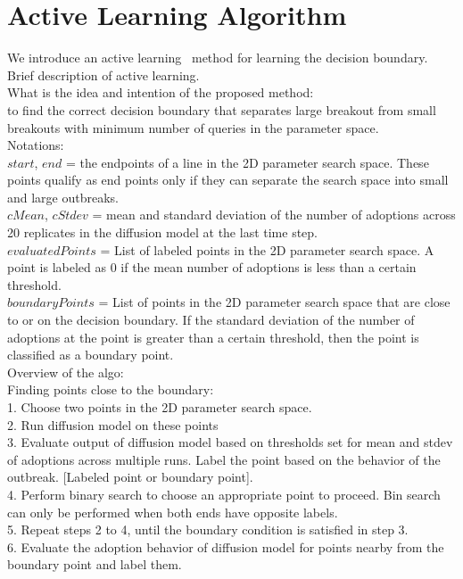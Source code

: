 \section{Active Learning Algorithm}
We introduce an active learning~\cite{sung95active} method for learning the decision boundary.
Brief description of active learning.\\
What is the idea and intention of the proposed method: \\
to find the correct decision boundary that separates large breakout from small breakouts with minimum number of queries in the parameter space.\\
\noindent
Notations:\\
$start$, $end$ = the endpoints of a line in the 2D parameter search space. These points qualify as end points only if they can separate the search space into small and large outbreaks. \\
\noindent
$cMean$, $cStdev$ = mean and standard deviation of the number of adoptions across 20 replicates in the diffusion model at the last time step.\\
\noindent
$evaluatedPoints$ = List of labeled points in the 2D parameter search space. A point is labeled as 0 if the mean number of adoptions is less than a certain threshold.\\
\noindent
$boundaryPoints$ = List of points in the 2D parameter search space that are close to or on the decision boundary. If the standard deviation of the number of adoptions at the point is greater than a certain threshold, then the point is classified as a boundary point.\\
Overview of the algo:\\
Finding points close to the boundary:\\
1. Choose two points in the 2D parameter search space.\\
2. Run diffusion model on these points\\
3. Evaluate output of diffusion model based on thresholds set for mean and stdev of adoptions across multiple runs. Label the point based on the behavior of the outbreak. [Labeled point or boundary point].\\
4. Perform binary search to choose an appropriate point to proceed. Bin search can only be performed when both ends have opposite labels.\\
5. Repeat steps 2 to 4, until the boundary condition is satisfied in step 3.\\
6. Evaluate the adoption behavior of diffusion model for points nearby from the boundary point and label them.

